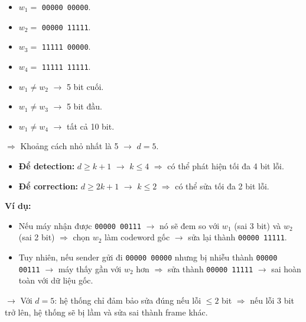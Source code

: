 \begin{center}
\begin{minipage}[c]{0.45\textwidth}
    \begin{itemize}
        \item $w_1 = $ \texttt{00000 00000}.
        \item $w_2 = $ \texttt{00000 11111}.
        \item $w_3 = $ \texttt{11111 00000}.
        \item $w_4 = $ \texttt{11111 11111}.
    \end{itemize}
\end{minipage}
\hfill
\begin{minipage}[c]{0.45\textwidth}
    \begin{itemize}
        \item $w_1 \not= w_2$ $\rightarrow$ 5 bit cuối.
        \item $w_1 \not= w_3$ $\rightarrow$ 5 bit đầu.
        \item $w_1 \not= w_4$ $\rightarrow$ tất cả 10 bit.
    \end{itemize}
\end{minipage}
\end{center}
\medskip

\noindent
$\Rightarrow$ Khoảng cách nhỏ nhất là 5 $\rightarrow$ $d = 5$.

\begin{itemize}
    \item \textbf{Để detection:} $d \geq k + 1$ $\rightarrow$ $k \leq 4$ $\Rightarrow$ có thể phát hiện tối đa 4 bit lỗi.
    \item \textbf{Để correction:} $d \geq 2k + 1$ $\rightarrow$ $k \leq 2$ $\Rightarrow$ có thể sửa tối đa 2 bit lỗi.
\end{itemize}
\medskip

\noindent
\textbf{Ví dụ:}

\begin{itemize}
    \item Nếu máy nhận được \texttt{00000 00111} $\rightarrow$ nó sẽ đem so với $w_1$ (sai 3 bit) và $w_2$ (sai 2 bit) $\Rightarrow$ chọn $w_2$ làm codeword gốc $\rightarrow$ sửa lại thành \texttt{00000 11111}.
    \item[$\Rightarrow$] Tuy nhiên, nếu sender gửi đi \texttt{00000 00000} nhưng bị nhiễu thành \texttt{00000 00111} $\rightarrow$ máy thấy gần với $w_2$ hơn $\Rightarrow$ sửa thành \texttt{00000 11111} $\rightarrow$ sai hoàn toàn với dữ liệu gốc.
\end{itemize}
\medskip

\noindent
$\rightarrow$ Với $d = 5$: hệ thống chỉ đảm bảo sửa đúng nếu lỗi $\leq 2$ bit $\Rightarrow$ nếu lỗi 3 bit trở lên, hệ thống sẽ bị lầm và sửa sai thành frame khác.
\medskip

